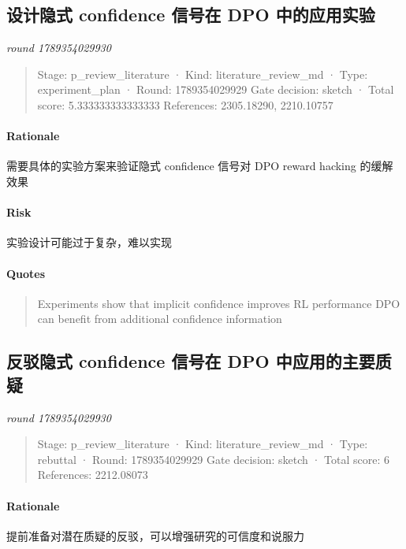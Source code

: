 \documentclass{article}
\begin{document}
\subsection{设计隐式 confidence 信号在 DPO 中的应用实验}
\textit{round 1789354029930}\\
\begin{quote}
Stage: p\_review\_literature  ·  Kind: literature\_review\_md  ·  Type: experiment\_plan  ·  Round: 1789354029929
Gate decision: sketch  ·  Total score: 5.333333333333333
References: 2305.18290, 2210.10757
\end{quote}

\paragraph{Rationale}

需要具体的实验方案来验证隐式 confidence 信号对 DPO reward hacking 的缓解效果

\paragraph{Risk}

实验设计可能过于复杂，难以实现

\paragraph{Quotes}
\begin{quote}
Experiments show that implicit confidence improves RL performance
DPO can benefit from additional confidence information
\end{quote}

\subsection{反驳隐式 confidence 信号在 DPO 中应用的主要质疑}
\textit{round 1789354029930}\\
\begin{quote}
Stage: p\_review\_literature  ·  Kind: literature\_review\_md  ·  Type: rebuttal  ·  Round: 1789354029929
Gate decision: sketch  ·  Total score: 6
References: 2212.08073
\end{quote}

\paragraph{Rationale}

提前准备对潜在质疑的反驳，可以增强研究的可信度和说服力
\end{document}
